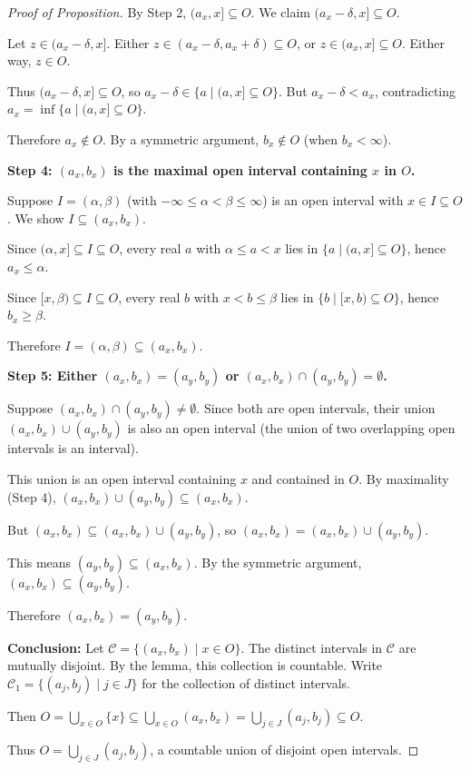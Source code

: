 \documentclass[11pt]{report}
\begin{document}
\begin{proof}[Proof of Proposition]
By Step 2, $(a_x, x] \subseteq O$. We claim $(a_x - \delta, x] \subseteq O$.

Let $z \in (a_x - \delta, x]$. Either $z \in (a_x - \delta, a_x + \delta) \subseteq O$, or $z \in (a_x, x] \subseteq O$. Either way, $z \in O$.

Thus $(a_x - \delta, x] \subseteq O$, so $a_x - \delta \in \{a \mid (a, x] \subseteq O\}$. But $a_x - \delta < a_x$, contradicting $a_x = \inf\{a \mid (a, x] \subseteq O\}$.

Therefore $a_x \notin O$. By a symmetric argument, $b_x \notin O$ (when $b_x < \infty$).

\textbf{Step 4: $(a_x, b_x)$ is the maximal open interval containing $x$ in $O$.}

Suppose $I = (\alpha, \beta)$ (with $-\infty \leq \alpha < \beta \leq \infty$) is an open interval with $x \in I \subseteq O$. We show $I \subseteq (a_x, b_x)$.

Since $(\alpha, x] \subseteq I \subseteq O$, every real $a$ with $\alpha \leq a < x$ lies in $\{a \mid (a, x] \subseteq O\}$, hence $a_x \leq \alpha$.

Since $[x, \beta) \subseteq I \subseteq O$, every real $b$ with $x < b \leq \beta$ lies in $\{b \mid [x, b) \subseteq O\}$, hence $b_x \geq \beta$.

Therefore $I = (\alpha, \beta) \subseteq (a_x, b_x)$.

\textbf{Step 5: Either $(a_x, b_x) = (a_y, b_y)$ or $(a_x, b_x) \cap (a_y, b_y) = \emptyset$.}

Suppose $(a_x, b_x) \cap (a_y, b_y) \neq \emptyset$. Since both are open intervals, their union $(a_x, b_x) \cup (a_y, b_y)$ is also an open interval (the union of two overlapping open intervals is an interval).

This union is an open interval containing $x$ and contained in $O$. By maximality (Step 4), $(a_x, b_x) \cup (a_y, b_y) \subseteq (a_x, b_x)$.

But $(a_x, b_x) \subseteq (a_x, b_x) \cup (a_y, b_y)$, so $(a_x, b_x) = (a_x, b_x) \cup (a_y, b_y)$.

This means $(a_y, b_y) \subseteq (a_x, b_x)$. By the symmetric argument, $(a_x, b_x) \subseteq (a_y, b_y)$.

Therefore $(a_x, b_x) = (a_y, b_y)$.

\textbf{Conclusion:} Let $\mathcal{C} = \{(a_x, b_x) \mid x \in O\}$. The distinct intervals in $\mathcal{C}$ are mutually disjoint. By the lemma, this collection is countable. Write $\mathcal{C}_1 = \{(a_j, b_j) \mid j \in J\}$ for the collection of distinct intervals.

Then $O = \bigcup_{x \in O} \{x\} \subseteq \bigcup_{x \in O} (a_x, b_x) = \bigcup_{j \in J} (a_j, b_j) \subseteq O$.

Thus $O = \bigcup_{j \in J} (a_j, b_j)$, a countable union of disjoint open intervals.
\end{proof}
\end{document}
